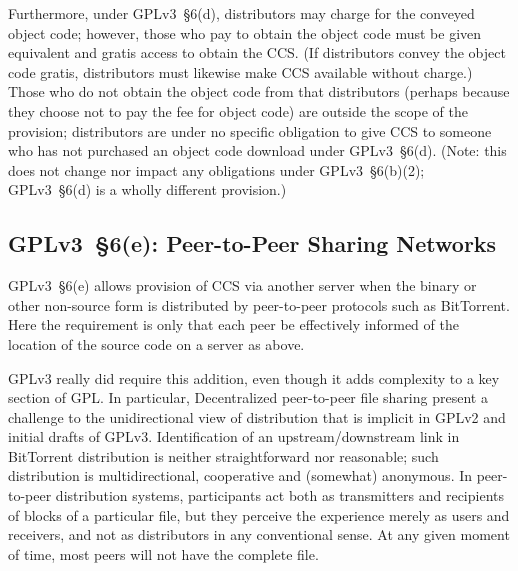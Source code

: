 Furthermore, under GPLv3~\S6(d), distributors may charge for the conveyed
object code; however, those who pay to obtain the object code must be given
equivalent and gratis access to obtain the CCS.  (If distributors convey the
object code gratis, distributors must likewise make CCS available without
charge.)  Those who do not obtain the object code from that distributors
(perhaps because they choose not to pay the fee for object code) are outside
the scope of the provision; distributors are under no specific obligation to
give CCS to someone who has not purchased an object code download under
GPLv3~\S6(d).  (Note: this does not change nor impact any obligations under
GPLv3~\S6(b)(2); GPLv3~\S6(d) is a wholly different provision.)

\subsection{GPLv3~\S6(e): Peer-to-Peer Sharing Networks}

GPLv3~\S6(e) allows provision of CCS via another server when the binary or
other non-source form is distributed by peer-to-peer protocols such as
BitTorrent.  Here the requirement is only that each peer be effectively
informed of the location of the source code on a server as above.

GPLv3 really did require this addition, even though it adds  complexity to
a key section of GPL\@.  In particular,
Decentralized peer-to-peer file sharing present a challenge
to the unidirectional view of distribution that is implicit in GPLv2 and
initial drafts of GPLv3.  Identification of an upstream/downstream link in
BitTorrent distribution is neither straightforward nor reasonable; such
distribution is multidirectional, cooperative and (somewhat) anonymous.  In peer-to-peer
distribution systems, participants act both as transmitters and recipients of
blocks of a particular file, but they perceive the experience merely as users
and receivers, and not as distributors in any conventional sense.  At any
given moment of time, most peers will not have the complete file.

